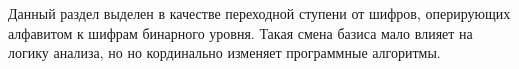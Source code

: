 Данный раздел выделен в качестве переходной ступени от шифров, оперирующих алфавитом к шифрам бинарного уровня. Такая смена базиса мало влияет на логику анализа, но но кординально изменяет программные алгоритмы.

